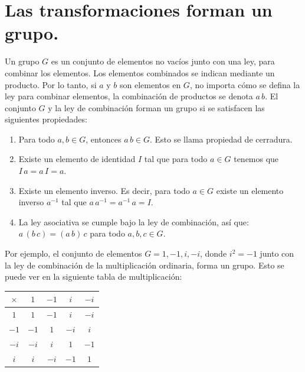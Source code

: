 \section{Las transformaciones forman un grupo.}

Un grupo $G$ es un conjunto de elementos no vacíos junto con una ley, para combinar los elementos. Los elementos combinados se indican mediante un producto. Por lo tanto, si $a$ y $b$ son elementos en $G$, no importa cómo se defina la ley para combinar elementos, la combinación de productos se denota $a \, b$. El conjunto $G$ y la ley de combinación forman un grupo si se satisfacen las siguientes propiedades:
\begin{enumerate}[label= (\roman*)]
\item Para todo $a, b \in G$, entonces $a \, b \in G$. Esto se llama propiedad de cerradura.
\item Existe un elemento de identidad $I$ tal que para todo $a \in G$ tenemos que $I \, a = a \, I = a$.
\item Existe un elemento inverso. Es decir, para todo $a \in G$ existe un elemento inverso $a^{-1}$ tal que $a \, a^{-1} = a^{-1} \, a = I$.
\item La ley asociativa se cumple bajo la ley de combinación, así que: $a \, (b \, c) = (a \, b) \,  c$ para todo $a, b, c \in G$.
\end{enumerate}

Por ejemplo, el conjunto de elementos $G = {1, -1, i, -i}$, donde $i^{2} = -1$ junto con la ley de combinación de la multiplicación ordinaria, forma un grupo. Esto se puede ver en la siguiente tabla de multiplicación:
\begin{table}[H]
\centering
\begin{tabular}{| c | c | c | c | c |} \hline
$\times$ & $1$ & $-1$ & $i$ & $-i$ \\ \hline
$1$ & $1$ & $-1$ & $i$ & $-i$ \\ \hline
$-1$ & $-1$ & $1$ & $-i$ & $i$ \\ \hline
$-i$ & $-i$ & $i$ & $1$ & $-1$ \\ \hline
$i$ & $i$ & $-i$ & $-1$ & $1$ \\ \hline
\end{tabular}
\end{table}

